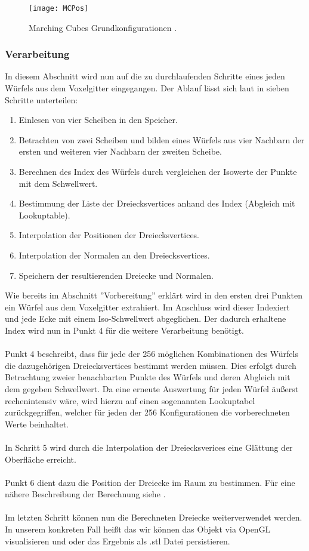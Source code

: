 \begin{figure}[H]
	\centering
	\texttt{[image: MCPos]}
	\caption{Marching Cubes Grundkonfigurationen \citep{MCAlgo}.}
	\label{fig:MCPos}
\end{figure}

\subsubsection{Verarbeitung}
In diesem Abschnitt wird nun auf die zu durchlaufenden Schritte eines jeden Würfels aus dem Voxelgitter eingegangen. Der Ablauf lässt sich laut \citep{MCAlgo} in sieben Schritte unterteilen:\\
\begin{enumerate}
	\item Einlesen von vier Scheiben in den Speicher.
	\item Betrachten von zwei Scheiben und bilden eines Würfels aus vier Nachbarn der ersten und weiteren vier Nachbarn der zweiten Scheibe.
	\item Berechnen des Index des Würfels durch vergleichen der Isowerte der Punkte mit dem Schwellwert.
	\item Bestimmung der Liste der Dreiecksvertices anhand des Index (Abgleich mit Lookuptable).
	\item Interpolation der Positionen der Dreiecksvertices.
	\item Interpolation der Normalen an den Dreiecksvertices.
	\item Speichern der resultierenden Dreiecke und Normalen.\\
\end{enumerate}

\noindent Wie bereits im Abschnitt ''Vorbereitung'' erklärt wird in den ersten drei Punkten ein Würfel aus dem Voxelgitter extrahiert. Im Anschluss wird dieser Indexiert und jede Ecke mit einem Iso-Schwellwert abgeglichen. Der dadurch erhaltene Index wird nun in Punkt 4 für die weitere Verarbeitung benötigt. \\
\\
Punkt 4 beschreibt, dass für jede der 256 möglichen Kombinationen des Würfels die dazugehörigen Dreiecksvertices bestimmt werden müssen. Dies erfolgt durch Betrachtung zweier benachbarten Punkte des Würfels und deren Abgleich mit dem gegeben Schwellwert. Da eine erneute Auswertung für jeden Würfel äußerst rechenintensiv wäre, wird hierzu auf einen sogenannten Lookuptabel zurückgegriffen, welcher für jeden der 256 Konfigurationen die vorberechneten Werte beinhaltet. \\
\\
In Schritt 5 wird durch die Interpolation der Dreiecksverices eine Glättung der Oberfläche erreicht.\\
\\
Punkt 6 dient dazu die Position der Dreiecke im Raum zu bestimmen. Für eine nähere Beschreibung der Berechnung siehe \citep{MCAlgo}.\\
\\
Im letzten Schritt können nun die Berechneten Dreiecke weiterverwendet werden. In unserem konkreten Fall heißt das wir können das Objekt via OpenGL visualisieren und oder das Ergebnis als .stl Datei persistieren.

